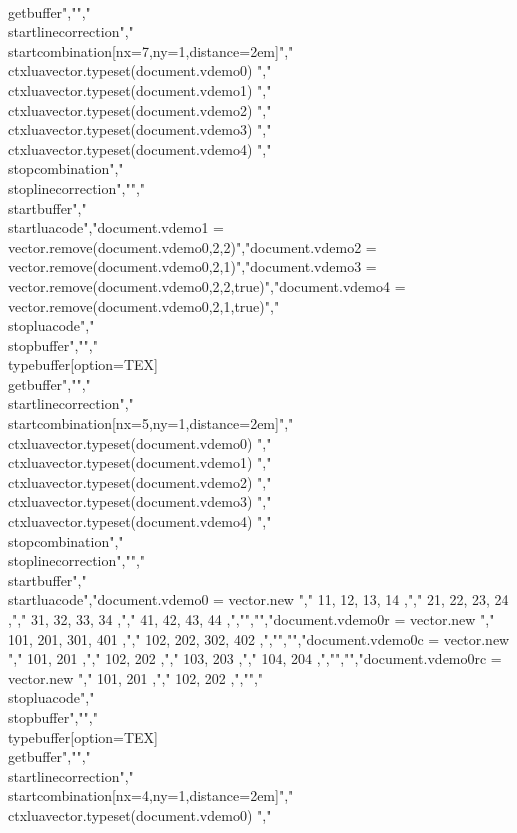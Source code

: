\\getbuffer","","\\startlinecorrection","\\startcombination[nx=7,ny=1,distance=2em]","    {\\ctxlua{vector.typeset(document.vdemo0)}} {}","    {\\ctxlua{vector.typeset(document.vdemo1)}} {}","    {\\ctxlua{vector.typeset(document.vdemo2)}} {}","    {\\ctxlua{vector.typeset(document.vdemo3)}} {}","    {\\ctxlua{vector.typeset(document.vdemo4)}} {}","\\stopcombination","\\stoplinecorrection","","\\startbuffer","\\startluacode","document.vdemo1 = vector.remove(document.vdemo0,2,2)","document.vdemo2 = vector.remove(document.vdemo0,2,1)","document.vdemo3 = vector.remove(document.vdemo0,2,2,true)","document.vdemo4 = vector.remove(document.vdemo0,2,1,true)","\\stopluacode","\\stopbuffer","","\\typebuffer[option=TEX] \\getbuffer","","\\startlinecorrection","\\startcombination[nx=5,ny=1,distance=2em]","    {\\ctxlua{vector.typeset(document.vdemo0)}} {}","    {\\ctxlua{vector.typeset(document.vdemo1)}} {}","    {\\ctxlua{vector.typeset(document.vdemo2)}} {}","    {\\ctxlua{vector.typeset(document.vdemo3)}} {}","    {\\ctxlua{vector.typeset(document.vdemo4)}} {}","\\stopcombination","\\stoplinecorrection","","\\startbuffer","\\startluacode","document.vdemo0 = vector.new {","    { 11, 12, 13, 14 },","    { 21, 22, 23, 24 },","    { 31, 32, 33, 34 },","    { 41, 42, 43, 44 },","}","","document.vdemo0r = vector.new {","    { 101, 201, 301, 401 },","    { 102, 202, 302, 402 },","}","","document.vdemo0c = vector.new {","    { 101, 201 },","    { 102, 202 },","    { 103, 203 },","    { 104, 204 },","}","","document.vdemo0rc = vector.new {","    { 101, 201 },","    { 102, 202 },","}","\\stopluacode","\\stopbuffer","","\\typebuffer[option=TEX] \\getbuffer","","\\startlinecorrection","\\startcombination[nx=4,ny=1,distance=2em]","    {\\ctxlua{vector.typeset(document.vdemo0)}}   {}","    